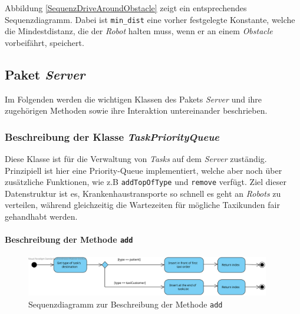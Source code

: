 			Abbildung \ref{SequenzDriveAroundObstacle} zeigt ein entsprechendes Sequenzdiagramm. 
			Dabei ist \texttt{min\_dist} eine vorher festgelegte Konstante, welche die Mindestdistanz, die der \textit{Robot} halten muss, wenn er an einem \textit{Obstacle} vorbeifährt, speichert.
	
\pagebreak
	
\subsection{Paket \textit{Server}}
	Im Folgenden werden die wichtigen Klassen des Pakets \textit{Server} 
	und ihre zugehörigen Methoden sowie ihre Interaktion untereinander beschrieben. 


	\subsubsection{Beschreibung der Klasse \textit{TaskPriorityQueue}}
	
	Diese Klasse ist für die Verwaltung von \textit{Tasks} auf dem \textit{Server} zuständig. Prinzipiell ist hier eine Priority-Queue implementiert, welche aber noch über zusätzliche Funktionen, wie z.B \texttt{addTopOfType} und \texttt{remove} verfügt. Ziel dieser Datenstruktur ist es, Krankenhaustransporte so schnell es geht an \textit{Robots} zu verteilen, während gleichzeitig die Wartezeiten für mögliche Taxikunden fair gehandhabt werden.
	
			\paragraph{Beschreibung der Methode \texttt{add}}		
			\begin{figure}[H]
			\centering
			\includegraphics[width=0.95\textwidth]{img/add}
			\caption{Sequenzdiagramm zur Beschreibung der Methode \texttt{add}}
			\label{SequenzQueueAdd}
			\end{figure}
			
